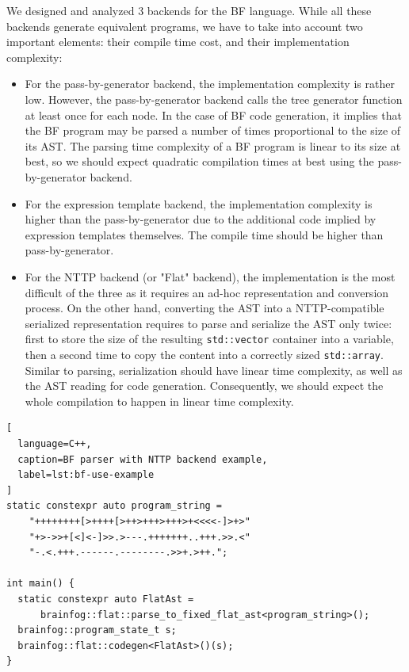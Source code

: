 \documentclass[../../main.tex]{subfiles}
\begin{document}
We designed and analyzed 3 backends for the BF language. While all these
backends generate equivalent programs, we have to take into account two
important elements: their compile time cost, and their implementation
complexity:

\begin{itemize}
\item For the pass-by-generator backend, the implementation complexity is
rather low. However, the pass-by-generator backend calls the tree
generator function at least once for each node. In the
case of BF code generation, it implies that the BF program may be parsed a
number of times proportional to the size of its AST. The parsing time complexity
of a BF program is linear to its size at best, so we should expect
quadratic compilation times at best using the pass-by-generator backend.\\

\item For the expression template backend, the implementation complexity is
higher than the pass-by-generator due to the additional code implied by expression
templates themselves. The compile time should be higher than pass-by-generator.\\

\item For the NTTP backend (or "Flat" backend), the implementation is the most
difficult of the three as it requires an ad-hoc representation and conversion
process.
On the other hand, converting the AST into a NTTP-compatible serialized
representation requires to parse and serialize the AST only twice: first to
store the size of the resulting \lstinline|std::vector| container into a
\constexpr variable, then a second time to copy the content into a
correctly sized \lstinline|std::array|. Similar to parsing, serialization should
have linear time complexity, as well as the AST reading for code generation.
Consequently, we should expect the whole compilation to happen in linear
time complexity.
\end{itemize}

\begin{lstlisting}[
  language=C++,
  caption=BF parser with NTTP backend example,
  label=lst:bf-use-example
]
static constexpr auto program_string =
    "++++++++[>++++[>++>+++>+++>+<<<<-]>+>"
    "+>->>+[<]<-]>>.>---.+++++++..+++.>>.<"
    "-.<.+++.------.--------.>>+.>++.";

int main() {
  static constexpr auto FlatAst =
      brainfog::flat::parse_to_fixed_flat_ast<program_string>();
  brainfog::program_state_t s;
  brainfog::flat::codegen<FlatAst>()(s);
}
\end{lstlisting}
\end{document}
